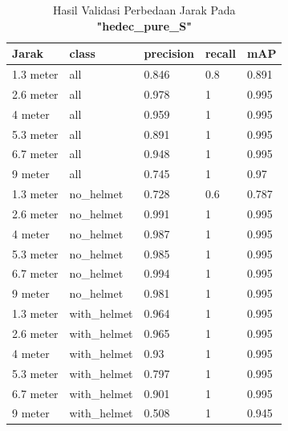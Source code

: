 \begin{enumerate}
  \begin{longtable}{|l|l|l|l|l|} 
    \caption{Hasil Validasi Perbedaan Jarak Pada \textbf{"hedec\_pure\_S"}}
    \label{tb:hasiljarak_hedec_pure_S}\\
    \hline
    Jarak     & class        & precision & recall & mAP    \\ 
    \hline
    1.3 meter & all          & 0.846     & 0.8    & 0.891  \\
    2.6 meter & all          & 0.978     & 1      & 0.995  \\
    4 meter   & all          & 0.959     & 1      & 0.995  \\
    5.3 meter & all          & 0.891     & 1      & 0.995  \\
    6.7 meter & all          & 0.948     & 1      & 0.995  \\
    9 meter   & all          & 0.745     & 1      & 0.97   \\
    1.3 meter & no\_helmet   & 0.728     & 0.6    & 0.787  \\
    2.6 meter & no\_helmet   & 0.991     & 1      & 0.995  \\
    4 meter   & no\_helmet   & 0.987     & 1      & 0.995  \\
    5.3 meter & no\_helmet   & 0.985     & 1      & 0.995  \\
    6.7 meter & no\_helmet   & 0.994     & 1      & 0.995  \\
    9 meter   & no\_helmet   & 0.981     & 1      & 0.995  \\
    1.3 meter & with\_helmet & 0.964     & 1      & 0.995  \\
    2.6 meter & with\_helmet & 0.965     & 1      & 0.995  \\
    4 meter   & with\_helmet & 0.93      & 1      & 0.995  \\
    5.3 meter & with\_helmet & 0.797     & 1      & 0.995  \\
    6.7 meter & with\_helmet & 0.901     & 1      & 0.995  \\
    9 meter   & with\_helmet & 0.508     & 1      & 0.945  \\
    \hline
  \end{longtable}


\end{enumerate}
